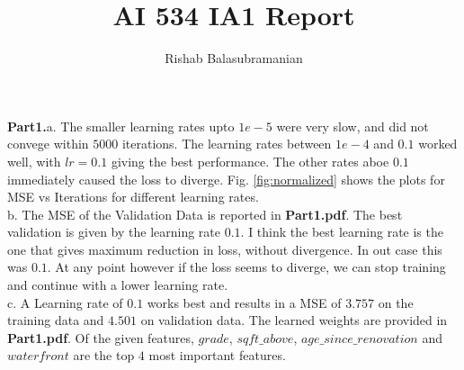 \documentclass{article}
\title{AI 534 IA1 Report}
\author{Rishab Balasubramanian}
\date{}
\begin{document}
\maketitle
\textbf{Part1.}a. The smaller learning rates upto $1e-5$ were very slow, and did not convege within $5000$ iterations. The learning rates between $1e-4$ and $0.1$ worked well, with $lr=0.1$ giving the best performance. The other rates aboe $0.1$ immediately caused the loss to diverge. Fig. \ref{fig:normalized} shows the plots for MSE vs Iterations for different learning rates.\\
 
b. The MSE of the Validation Data is reported in \textbf{Part1.pdf}. The best validation is given by the learning rate $0.1$. I think the best learning rate is the one that gives maximum reduction in loss, without divergence. In out case this was $0.1$. At any point however if the loss seems to diverge, we can stop training and continue with a lower learning rate.\\

c. A Learning rate of $0.1$ works best and results in a MSE of $3.757$ on the training data and $4.501$ on validation data. The learned weights are provided in \textbf{Part1.pdf}. Of the given features, $grade$, $sqft\_above$, $age\_since\_renovation$ and $waterfront$ are the top $4$ most important features.\\
\end{document}
